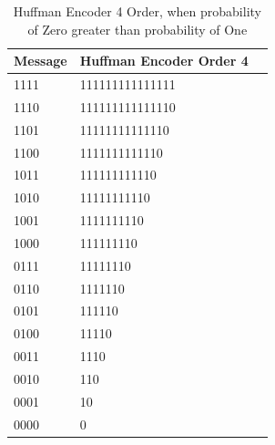 \begin{refsection}
\begin{table}[H]
\centering
\caption{Huffman Encoder 4 Order, when probability of Zero greater than probability of One}
\label{tb:hufmmanencoder7}
\begin{tabular}{|l|l|l|}
\hline
\textbf{Message}                      & \textbf{Huffman Encoder Order 4}                                       \\ \hline
1111                 & 111111111111111                                                         \\ \hline
1110                 & 111111111111110                                              \\ \hline
1101                 & 11111111111110                                            \\ \hline
1100                 & 1111111111110                                       \\ \hline
1011                 & 111111111110                                                          \\ \hline
1010                 & 11111111110                                                          \\ \hline
1001                 & 1111111110                                                         \\ \hline
1000                 & 111111110                                                         \\ \hline
0111                 & 11111110                                                          \\ \hline
0110                 & 1111110                                                          \\ \hline
0101                 & 111110                                                         \\ \hline
0100                 & 11110                                                   \\ \hline
0011                 & 1110                                                          \\ \hline
0010                 & 110                                                          \\ \hline
0001                 & 10                                                         \\ \hline
0000                 & 0                                                         \\ \hline
\end{tabular}
\end{table}


\end{refsection}
